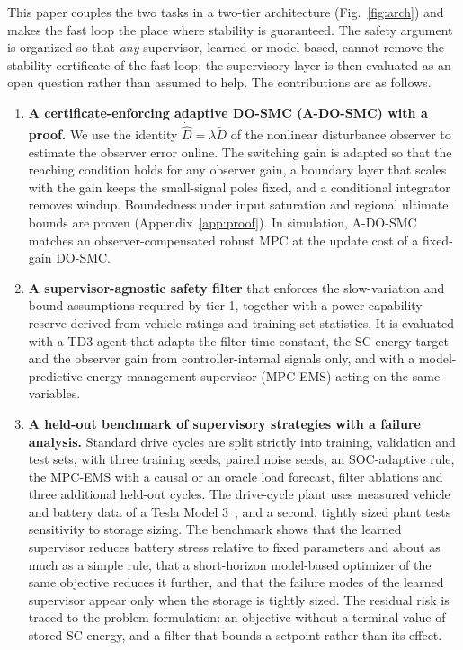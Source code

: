 This paper couples the two tasks in a two-tier architecture (Fig.~\ref{fig:arch}) and makes the fast loop the place where stability is guaranteed. The safety argument is organized so that \emph{any} supervisor, learned or model-based, cannot remove the stability certificate of the fast loop; the supervisory layer is then evaluated as an open question rather than assumed to help. The contributions are as follows.
\begin{enumerate}
\item \textbf{A certificate-enforcing adaptive DO-SMC (A-DO-SMC) with a proof.} We use the identity $\dot{\hat D}=\lambda\tilde D$ of the nonlinear disturbance observer to estimate the observer error online. The switching gain is adapted so that the reaching condition holds for any observer gain, a boundary layer that scales with the gain keeps the small-signal poles fixed, and a conditional integrator removes windup. Boundedness under input saturation and regional ultimate bounds are proven (Appendix~\ref{app:proof}). In simulation, A-DO-SMC matches an observer-compensated robust MPC at the update cost of a fixed-gain DO-SMC.
\item \textbf{A supervisor-agnostic safety filter} that enforces the slow-variation and bound assumptions required by tier 1, together with a power-capability reserve derived from vehicle ratings and training-set statistics. It is evaluated with a TD3 agent that adapts the filter time constant, the SC energy target and the observer gain from controller-internal signals only, and with a model-predictive energy-management supervisor (MPC-EMS) acting on the same variables.
\item \textbf{A held-out benchmark of supervisory strategies with a failure analysis.} Standard drive cycles are split strictly into training, validation and test sets, with three training seeds, paired noise seeds, an SOC-adaptive rule, the MPC-EMS with a causal or an oracle load forecast, filter ablations and three additional held-out cycles. The drive-cycle plant uses measured vehicle and battery data of a Tesla Model 3~\cite{rosenberger2024m3}, and a second, tightly sized plant tests sensitivity to storage sizing. The benchmark shows that the learned supervisor reduces battery stress relative to fixed parameters and about as much as a simple rule, that a short-horizon model-based optimizer of the same objective reduces it further, and that the failure modes of the learned supervisor appear only when the storage is tightly sized. The residual risk is traced to the problem formulation: an objective without a terminal value of stored SC energy, and a filter that bounds a setpoint rather than its effect.
\end{enumerate}

